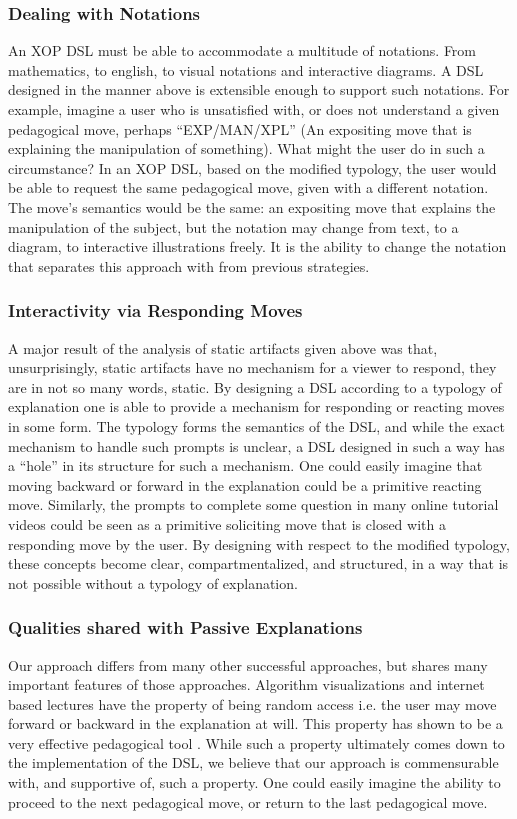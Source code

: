 \documentclass[conference]{IEEEtran}
\begin{document}
\subsubsection{Dealing with Notations}
An XOP DSL must be able to accommodate a multitude of notations. From
mathematics, to english, to visual notations and interactive diagrams. A DSL
designed in the manner above is extensible enough to support such
notations. For example, imagine a user who is unsatisfied with, or does not
understand a given pedagogical move, perhaps ``EXP/MAN/XPL'' (An expositing move
that is explaining the manipulation of something). What might the user do in such a
circumstance? In an XOP DSL, based on the modified typology, the user would be
able to request the same pedagogical move, given with a different notation. The move's
semantics would be the same: an expositing move that explains the
manipulation of the subject, but the notation may change from text, to a
diagram, to interactive illustrations freely. It is the ability to change the notation
that separates this approach with from previous strategies.

\subsubsection{Interactivity via Responding Moves}
A major result of the analysis of static artifacts given above was that,
unsurprisingly, static artifacts have no mechanism for a viewer to respond, they
are in not so many words, static. By designing a DSL according to a typology of
explanation one is able to provide a mechanism for responding or reacting moves
in some form. The typology forms the semantics of the DSL, and while the exact
mechanism to handle such prompts is unclear, a DSL designed in such a way has a
``hole'' in its structure for such a mechanism. One could easily imagine that
moving backward or forward in the explanation could be a primitive reacting
move. Similarly, the prompts to complete some question in many online tutorial
videos could be seen as a primitive soliciting move that is closed with a
responding move by the user. By designing with respect to the modified typology,
these concepts become clear, compartmentalized, and structured, in a way that is
not possible without a typology of explanation.

\subsubsection{Qualities shared with Passive Explanations}
Our approach differs from many other successful approaches,  but shares many important features of those approaches.
Algorithm visualizations and internet based lectures have the property of being
random access i.e. the user may move forward or backward in the explanation at
will. This property has shown to be a very effective pedagogical tool
. While such a property ultimately comes
down to the implementation of the DSL, we believe that our approach is
commensurable with, and supportive of, such a property. One could easily imagine
the ability to proceed to the next pedagogical move, or return to the last
pedagogical move.
\end{document}
